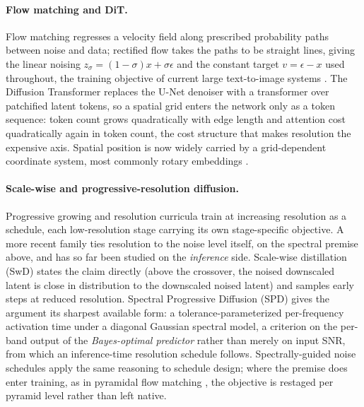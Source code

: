 \paragraph{Flow matching and DiT.}
Flow matching \citep{lipman2023flow} regresses a velocity field along
prescribed probability paths between noise and data; rectified flow
\citep{liu2023rectified} takes the paths to be straight lines, giving
the linear noising $z_\sigma = (1-\sigma)x + \sigma\epsilon$ and the
constant target $v = \epsilon - x$ used throughout, the training
objective of current large text-to-image systems
\citep{esser2024scaling}. The Diffusion Transformer
\citep{peebles2023dit} replaces the U-Net denoiser with a transformer
over patchified latent tokens, so a spatial grid enters the network
only as a token sequence: token count grows quadratically with edge
length and attention cost quadratically again in token count, the cost
structure that makes resolution the expensive axis. Spatial position is
now widely carried by a grid-dependent coordinate system, most commonly
rotary embeddings \citep{su2024roformer}.

\paragraph{Scale-wise and progressive-resolution diffusion.}
Progressive growing \citep{karras2018progressive} and resolution
curricula \citep{chen2024pixartalpha,hoogeboom2023simple} train at
increasing resolution as a schedule, each low-resolution stage carrying
its own stage-specific objective. A more recent family ties resolution
to the noise level itself, on the spectral premise above, and has so
far been studied on the \emph{inference} side. Scale-wise distillation
(SwD) \citep{starodubcev2025swd} states the claim directly (above the
crossover, the noised downscaled latent is close in distribution to the
downscaled noised latent) and samples early steps at reduced
resolution. Spectral Progressive Diffusion (SPD) \citep{xiao2026spd}
gives the argument its sharpest available form: a
tolerance-parameterized per-frequency activation time under a diagonal
Gaussian spectral model, a criterion on the per-band output of the
\emph{Bayes-optimal predictor} rather than merely on input SNR, from
which an inference-time resolution schedule follows. Spectrally-guided
noise schedules \citep{esteves2026spectral} apply the same reasoning
to schedule design; where the premise does enter training, as in
pyramidal flow matching \citep{jin2024pyramidal}, the objective is
restaged per pyramid level rather than left native.


